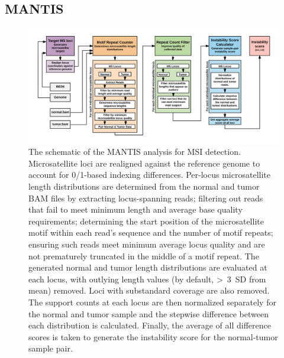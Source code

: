 \subsection{MANTIS}
\label{ssec:msilandscape:mantis}
\begin{figure}[htp]
	\centering
	\includegraphics[width=\linewidth,keepaspectratio]{images/msilandscape/mantis_flowchart}
	\caption[Schematic of the MANTIS analysis for MSI detection.]{The schematic of the MANTIS analysis for MSI detection. Microsatellite loci are realigned against the reference genome to account for 0/1-based indexing differences. Per-locus microsatellite length distributions are determined from the normal and tumor BAM files by extracting locus-spanning reads; filtering out reads that fail to meet minimum length and average base quality requirements; determining the start position of the microsatellite motif within each read's sequence and the number of motif repeats; ensuring such reads meet minimum average locus quality and are not prematurely truncated in the middle of a motif repeat. The generated normal and tumor length distributions are evaluated at each locus, with outlying length values (by default, \textgreater{}~3~SD from mean) removed. Loci with substandard coverage are also removed. The support counts at each locus are then normalized separately for the normal and tumor sample and the stepwise difference between each distribution is calculated. Finally, the average of all difference scores is taken to generate the instability score for the normal-tumor sample pair.}
	\label{fig:msilandscape:mantis_flowchart}
\end{figure}
